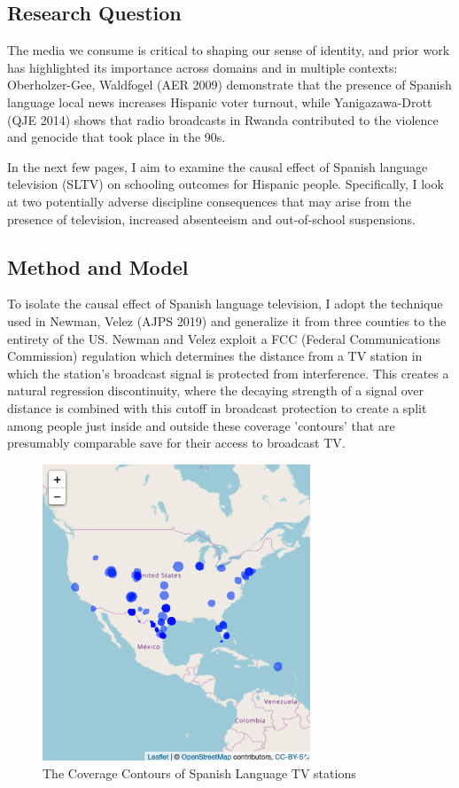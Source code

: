 \documentclass{article}
\begin{document}
\subsection*{Research Question}

The media we consume is critical to shaping our sense of identity, and prior work has highlighted its importance across domains and in multiple contexts: Oberholzer-Gee, Waldfogel (AER 2009) demonstrate that the presence of Spanish language local news increases Hispanic voter turnout, while Yanigazawa-Drott (QJE 2014) shows that radio broadcasts in Rwanda contributed to the violence and genocide that took place in the 90s.

In the next few pages, I aim to examine the causal effect of Spanish language television (SLTV) on schooling outcomes for Hispanic people. Specifically, I look at two potentially adverse discipline consequences that may arise from the presence of television, increased absenteeism and out-of-school suspensions.


\subsection*{Method and Model}

To isolate the causal effect of Spanish language television, I adopt the technique used in Newman, Velez (AJPS 2019) and generalize it from three counties to the entirety of the US. Newman and Velez exploit a FCC (Federal Communications Commission) regulation which determines the distance from a TV station in which the station's broadcast signal is protected from interference. This creates a natural regression discontinuity, where the decaying strength of a signal over distance is combined with this cutoff in broadcast protection to create a split among people just inside and outside these coverage 'contours' that are presumably comparable save for their access to broadcast TV. 


\begin{figure}[!hbtp]
\centering
\caption{The Coverage Contours of Spanish Language TV stations}
\includegraphics[width=8cm]{../analysis/Output/img/SpanishContours.png}
\end{figure} 
\end{document}
